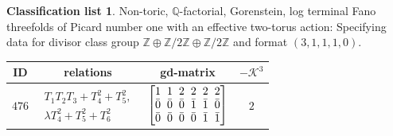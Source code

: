 \documentclass[pdftex]{sigma}%
\theoremstyle{definition}
\newtheorem{class-list}[thm]{Classification list}
\def\ZZ{{\mathbb Z}}
\def\QQ{{\mathbb Q}}
\numberwithin{equation}{section}
\begin{document}
\begin{class-list}
Non-toric, $\QQ$-factorial, Gorenstein, log terminal Fano
threefolds of Picard number one with an effective two-torus action:
Specifying data for divisor class group
$\ZZ\oplus \ZZ/2\ZZ\oplus \ZZ/2\ZZ$ and format $(3,1,1,1,0)$.
\begin{table}[h!]\centering\setlength{\tabcolsep}{5.5pt}
\renewcommand{\arraystretch}{1.25}\small\tabulinesep=1mm
\begin{tabu}{c|c|c|c}
\hline
ID&relations&gd-matrix&$-\mathcal{K}^3$
\\
\hline
${476}$&$\begin{array}{r}{T_{1}T_{2}T_{3}+T_{4}^{2}+T_{5}^{2}},\\ {\lambda T_{4}^{2}+T_{5}^{2}+T_{6}^{2}}\end{array}$
&$\arraycolsep=1mm\begin{bmatrix}{1} & {1} & {2} & {2} & {2} & {2} \\ {\bar{0}} & {\bar{0}} & {\bar{0}} & {\bar{1}} & {\bar{1}} & {\bar{0}} \\ {\bar{0}} & {\bar{0}} & {\bar{0}} & {\bar{0}} & {\bar{1}} & {\bar{1}}\end{bmatrix}$&${2}$
\\
\hline
\end{tabu}%
\end{table}
\end{class-list}
\end{document}
